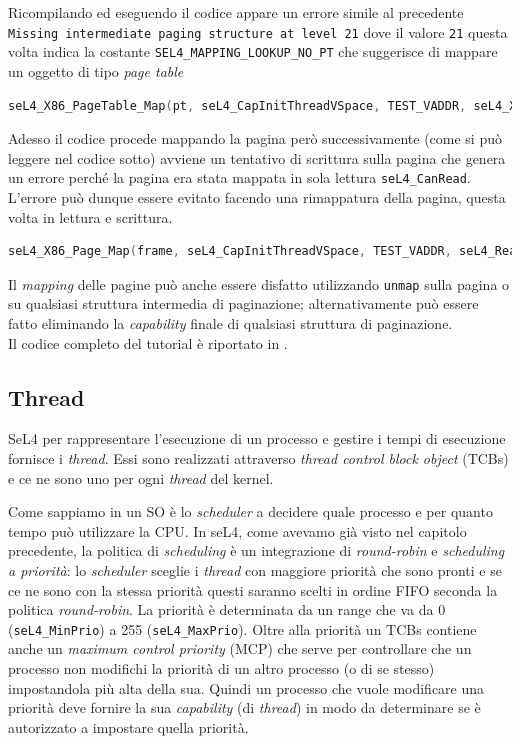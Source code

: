 Ricompilando ed eseguendo il codice appare un errore simile al precedente \texttt{Missing intermediate paging structure at level 21} dove il valore \texttt{21} questa volta indica la costante \texttt{SEL4\_MAPPING\_LOOKUP\_NO\_PT} che suggerisce di mappare un oggetto di tipo \textit{page table}
\begin{lstlisting}[language=C++]
seL4_X86_PageTable_Map(pt, seL4_CapInitThreadVSpace, TEST_VADDR, seL4_X86_Default_VMAttributes);
\end{lstlisting}

Adesso il codice procede mappando la pagina però successivamente (come si può leggere nel codice sotto) avviene un tentativo di scrittura sulla pagina che genera un errore perché la pagina era stata mappata in sola lettura \texttt{seL4\_CanRead}. L'errore può dunque essere evitato facendo una rimappatura della pagina, questa volta in lettura e scrittura.
\begin{lstlisting}[language=C++]
seL4_X86_Page_Map(frame, seL4_CapInitThreadVSpace, TEST_VADDR, seL4_ReadWrite, seL4_X86_Default_VMAttributes);
\end{lstlisting}

Il \textit{mapping} delle pagine può anche essere disfatto utilizzando \texttt{unmap} sulla pagina o su qualsiasi struttura intermedia di paginazione; alternativamente può essere fatto eliminando la \textit{capability} finale di qualsiasi struttura di paginazione.\\
Il codice completo del tutorial è riportato in \cite{mapping}.

\subsection{Thread}
SeL4 per rappresentare l'esecuzione di un processo e gestire i tempi di esecuzione fornisce i \textit{thread}. Essi sono realizzati attraverso \textit{thread control block object} (TCBs) e ce ne sono uno per ogni \textit{thread} del kernel.

Come sappiamo in un SO è lo \textit{scheduler} a decidere quale processo e per quanto tempo può utilizzare la CPU. In seL4, come avevamo già visto nel capitolo precedente, la politica di \textit{scheduling} è un integrazione di \textit{round-robin} e \textit{scheduling a priorità}: lo \textit{scheduler} sceglie i \textit{thread} con maggiore priorità che sono pronti e se ce ne sono con la stessa priorità questi saranno scelti in ordine FIFO seconda la politica \textit{round-robin}. La priorità è determinata da un range che va da 0 (\texttt{seL4\_MinPrio}) a 255 (\texttt{seL4\_MaxPrio}). Oltre alla priorità un TCBs contiene anche un \textit{maximum control priority} (MCP) che serve per controllare che un processo non modifichi la priorità di un altro processo (o di se stesso) impostandola più alta della sua. Quindi un processo che vuole modificare una priorità deve fornire la sua \textit{capability} (di \textit{thread}) in modo da determinare se è autorizzato a impostare quella priorità.

